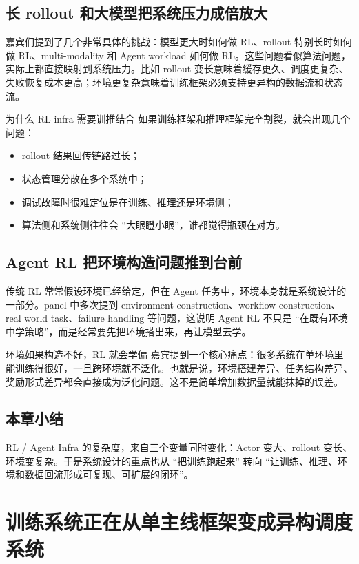 \documentclass[a4paper]{article}
\begin{document}
\subsection{长 rollout 和大模型把系统压力成倍放大}
嘉宾们提到了几个非常具体的挑战：模型更大时如何做 RL、rollout 特别长时如何做 RL、multi-modality 和 Agent workload 如何做 RL。这些问题看似算法问题，实际上都直接映射到系统压力。比如 rollout 变长意味着缓存更久、调度更复杂、失败恢复成本更高；环境更复杂意味着训练框架必须支持更异构的数据流和状态流。

\begin{knowledgebox}{为什么 RL infra 需要训推结合}
如果训练框架和推理框架完全割裂，就会出现几个问题：
\begin{itemize}
  \item rollout 结果回传链路过长；
  \item 状态管理分散在多个系统中；
  \item 调试故障时很难定位是在训练、推理还是环境侧；
  \item 算法侧和系统侧往往会 ``大眼瞪小眼''，谁都觉得瓶颈在对方。
\end{itemize}
\end{knowledgebox}

\subsection{Agent RL 把环境构造问题推到台前}
传统 RL 常常假设环境已经给定，但在 Agent 任务中，环境本身就是系统设计的一部分。panel 中多次提到 environment construction、workflow construction、real world task、failure handling 等问题，这说明 Agent RL 不只是 ``在既有环境中学策略''，而是经常要先把环境搭出来，再让模型去学。

\begin{warningbox}{环境如果构造不好，RL 就会学偏}
嘉宾提到一个核心痛点：很多系统在单环境里能训练得很好，一旦跨环境就不泛化。也就是说，环境搭建差异、任务结构差异、奖励形式差异都会直接成为泛化问题。这不是简单增加数据量就能抹掉的误差。
\end{warningbox}

\subsection{本章小结}
RL / Agent Infra 的复杂度，来自三个变量同时变化：Actor 变大、rollout 变长、环境变复杂。于是系统设计的重点也从 ``把训练跑起来'' 转向 ``让训练、推理、环境和数据回流形成可复现、可扩展的闭环''。

\section{训练系统正在从单主线框架变成异构调度系统}
\end{document}
